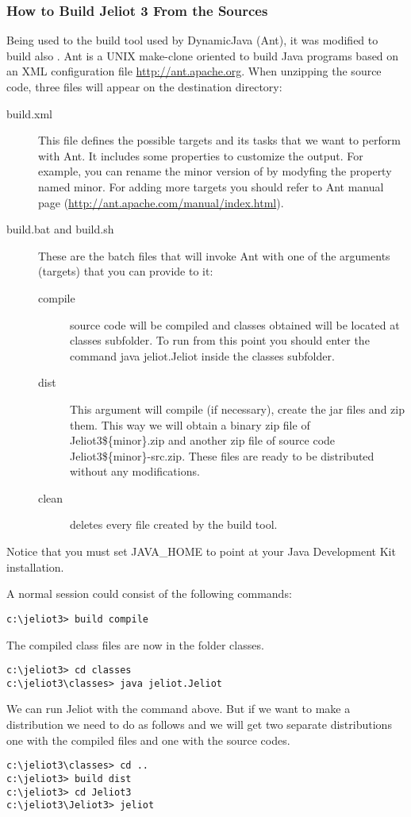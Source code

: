 \subsubsection{How to Build Jeliot 3 From the Sources}

Being used to the build tool used by DynamicJava (Ant), it was
modified to build also \jel{}. Ant is a UNIX make-clone oriented
to build Java programs based on an XML configuration file \url{http://ant.apache.org}.
When unzipping the source code, three files will appear on the
destination directory:
\begin{description}
\item[build.xml] This file defines the possible targets and its tasks
that we want to perform with Ant. It includes some properties
to customize the output. For example, you can rename the minor
version of \jel{} by modyfing the property named minor. For adding
more targets you should refer to Ant manual page
(\url{http://ant.apache.com/manual/index.html}).
\item[build.bat and build.sh] These are the batch files that
will invoke Ant with one of the arguments (targets) that you
can provide to it:
\begin{description}
\item[compile] \jel{} source code will be compiled and classes obtained
will be located at classes subfolder. To run \jel{} from this
point you should enter the command java jeliot.Jeliot inside
the classes subfolder.
\item[dist] This argument will compile (if necessary), create the
jar files and zip them. This way we will obtain a binary zip
file of \jel{} Jeliot3\$\{minor\}.zip and another
zip file of \jel{} source code Jeliot3\$\{minor\}-src.zip.
These files are ready to be distributed without any modifications.
\item[clean] deletes every file created by the build tool.
\end{description}
\end{description}
Notice that you must set JAVA\_HOME to point at your Java Development
Kit installation.

A normal session could consist of the following commands:
\begin{verbatim}
c:\jeliot3> build compile
\end{verbatim}
The compiled class files are now in the folder classes.
\begin{verbatim}
c:\jeliot3> cd classes
c:\jeliot3\classes> java jeliot.Jeliot
\end{verbatim}
We can run Jeliot with the command above. But if we want to make a
distribution we need to do as follows and we will get two separate
distributions one with the compiled files and one with the source codes.
\begin{verbatim}
c:\jeliot3\classes> cd ..
c:\jeliot3> build dist
c:\jeliot3> cd Jeliot3
c:\jeliot3\Jeliot3> jeliot
\end{verbatim}

